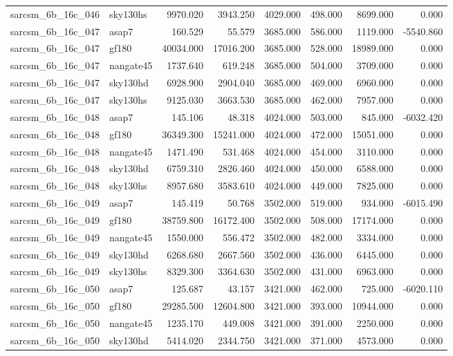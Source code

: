 \begin{tabular}{llrrrrrr}
sarcsm\_6b\_16c\_046 & sky130hs & 9970.020 & 3943.250 & 4029.000 & 498.000 & 8699.000 & 0.000 \\
sarcsm\_6b\_16c\_047 & asap7 & 160.529 & 55.579 & 3685.000 & 586.000 & 1119.000 & -5540.860 \\
sarcsm\_6b\_16c\_047 & gf180 & 40034.000 & 17016.200 & 3685.000 & 528.000 & 18989.000 & 0.000 \\
sarcsm\_6b\_16c\_047 & nangate45 & 1737.640 & 619.248 & 3685.000 & 504.000 & 3709.000 & 0.000 \\
sarcsm\_6b\_16c\_047 & sky130hd & 6928.900 & 2904.040 & 3685.000 & 469.000 & 6960.000 & 0.000 \\
sarcsm\_6b\_16c\_047 & sky130hs & 9125.030 & 3663.530 & 3685.000 & 462.000 & 7957.000 & 0.000 \\
sarcsm\_6b\_16c\_048 & asap7 & 145.106 & 48.318 & 4024.000 & 503.000 & 845.000 & -6032.420 \\
sarcsm\_6b\_16c\_048 & gf180 & 36349.300 & 15241.000 & 4024.000 & 472.000 & 15051.000 & 0.000 \\
sarcsm\_6b\_16c\_048 & nangate45 & 1471.490 & 531.468 & 4024.000 & 454.000 & 3110.000 & 0.000 \\
sarcsm\_6b\_16c\_048 & sky130hd & 6759.310 & 2826.460 & 4024.000 & 450.000 & 6588.000 & 0.000 \\
sarcsm\_6b\_16c\_048 & sky130hs & 8957.680 & 3583.610 & 4024.000 & 449.000 & 7825.000 & 0.000 \\
sarcsm\_6b\_16c\_049 & asap7 & 145.419 & 50.768 & 3502.000 & 519.000 & 934.000 & -6015.490 \\
sarcsm\_6b\_16c\_049 & gf180 & 38759.800 & 16172.400 & 3502.000 & 508.000 & 17174.000 & 0.000 \\
sarcsm\_6b\_16c\_049 & nangate45 & 1550.000 & 556.472 & 3502.000 & 482.000 & 3334.000 & 0.000 \\
sarcsm\_6b\_16c\_049 & sky130hd & 6268.680 & 2667.560 & 3502.000 & 436.000 & 6445.000 & 0.000 \\
sarcsm\_6b\_16c\_049 & sky130hs & 8329.300 & 3364.630 & 3502.000 & 431.000 & 6963.000 & 0.000 \\
sarcsm\_6b\_16c\_050 & asap7 & 125.687 & 43.157 & 3421.000 & 462.000 & 725.000 & -6020.110 \\
sarcsm\_6b\_16c\_050 & gf180 & 29285.500 & 12604.800 & 3421.000 & 393.000 & 10944.000 & 0.000 \\
sarcsm\_6b\_16c\_050 & nangate45 & 1235.170 & 449.008 & 3421.000 & 391.000 & 2250.000 & 0.000 \\
sarcsm\_6b\_16c\_050 & sky130hd & 5414.020 & 2344.750 & 3421.000 & 371.000 & 4573.000 & 0.000 \\

\end{tabular}
